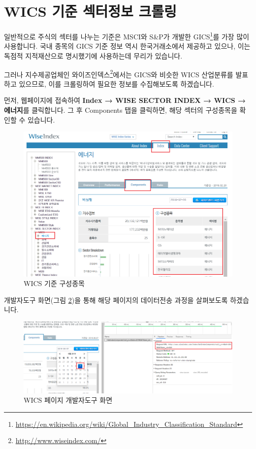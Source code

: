 \documentclass[12pt,]{book}
\let\rmarkdownfootnote\footnote%
\def\footnote{\protect\rmarkdownfootnote}
\begin{document}
\hypertarget{wics---}{%
\section{WICS 기준 섹터정보 크롤링}\label{wics---}}

일반적으로 주식의 섹터를 나누는 기준은 MSCI와 S\&P가 개발한 GICS\footnote{\url{https://en.wikipedia.org/wiki/Global_Industry_Classification_Standard}}를 가장 많이 사용합니다. 국내 종목의 GICS 기준 정보 역시 한국거래소에서 제공하고 있으나, 이는 독점적 지적재산으로 명시했기에 사용하는데 무리가 있습니다.

그러나 지수제공업체인 와이즈인덱스\footnote{\url{http://www.wiseindex.com/}}에서는 GICS와 비슷한 WICS 산업분류를 발표하고 있으므로, 이를 크롤링하여 필요한 정보를 수집해보도록 하겠습니다.

먼저, 웹페이지에 접속하여 \textbf{Index → WISE SECTOR INDEX → WICS → 에너지}를 클릭합니다. 그 후 Components 탭을 클릭하면, 해당 섹터의 구성종목을 확인할 수 있습니다.

\begin{figure}[h]

{\centering \includegraphics[width=1\linewidth]{images/crawl_practice_wics} 

}

\caption{WICS 기준 구성종목}\label{fig:unnamed-chunk-25}
\end{figure}

개발자도구 화면(그림 \ref{fig:wicurl})을 통해 해당 페이지의 데이터전송 과정을 살펴보도록 하겠습니다.

\begin{figure}[h]

{\centering \includegraphics[width=1\linewidth]{images/crawl_practice_wics2} 

}

\caption{WICS 페이지 개발자도구 화면}\label{fig:wicurl}
\end{figure}
\end{document}
